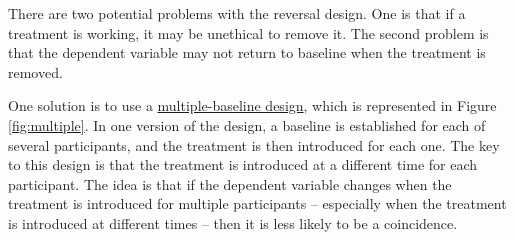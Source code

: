 \documentclass[
]{krantz}
\begin{document}
There are two potential problems with the reversal design. One is that if a treatment is working, it may be unethical to remove it. The second problem is that the dependent variable may not return to baseline when the treatment is removed.

One solution is to use a \hyperref[multiple-baseline-design]{multiple-baseline design}, which is represented in Figure \ref{fig:multiple}. In one version of the design, a baseline is established for each of several participants, and the treatment is then introduced for each one. The key to this design is that the treatment is introduced at a different time for each participant. The idea is that if the dependent variable changes when the treatment is introduced for multiple participants -- especially when the treatment is introduced at different times -- then it is less likely to be a coincidence.
\end{document}
